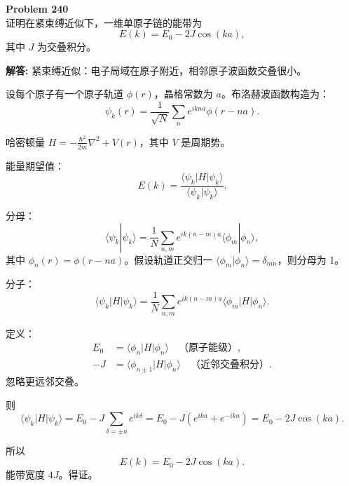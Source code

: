 \documentclass[12pt, a4paper, oneside]{ctexart}
\newenvironment{solution}{\par\noindent\textbf{解答:}\quad}{\par}
\begin{document}
\begin{mdframed}[backgroundcolor=gray!10, linewidth=0pt]
    \textbf{Problem 240} \\
    证明在紧束缚近似下，一维单原子链的能带为
    \[
    E(k) = E_0 - 2J \cos(k a),
    \]
    其中 $J$ 为交叠积分。
\end{mdframed}
\begin{solution}
    紧束缚近似：电子局域在原子附近，相邻原子波函数交叠很小。
    
    设每个原子有一个原子轨道 $\phi(r)$，晶格常数为 $a$。布洛赫波函数构造为：
    \[
    \psi_k(r) = \frac{1}{\sqrt{N}} \sum_n e^{i k n a} \phi(r - n a).
    \]
    
    哈密顿量 $H = -\frac{\hbar^2}{2m} \nabla^2 + V(r)$，其中 $V$ 是周期势。
    
    能量期望值：
    \[
    E(k) = \frac{\langle \psi_k | H | \psi_k \rangle}{\langle \psi_k | \psi_k \rangle}.
    \]
    
    分母：
    \[
    \langle \psi_k | \psi_k \rangle = \frac{1}{N} \sum_{n,m} e^{i k (n-m) a} \langle \phi_m | \phi_n \rangle,
    \]
    其中 $\phi_n(r) = \phi(r - n a)$。假设轨道正交归一 $\langle \phi_m | \phi_n \rangle = \delta_{mn}$，则分母为 1。
    
    分子：
    \[
    \langle \psi_k | H | \psi_k \rangle = \frac{1}{N} \sum_{n,m} e^{i k (n-m) a} \langle \phi_m | H | \phi_n \rangle.
    \]
    
    定义：
    \begin{align*}
        E_0 &= \langle \phi_n | H | \phi_n \rangle \quad \text{（原子能级）}, \\
        -J &= \langle \phi_{n\pm1} | H | \phi_n \rangle \quad \text{（近邻交叠积分）}.
    \end{align*}
    忽略更远邻交叠。
    
    则
    \[
    \langle \psi_k | H | \psi_k \rangle = E_0 - J \sum_{\delta=\pm a} e^{i k \delta} = E_0 - J (e^{i k a} + e^{-i k a}) = E_0 - 2J \cos(k a).
    \]
    
    所以
    \[
    E(k) = E_0 - 2J \cos(k a).
    \]
    能带宽度 $4J$。得证。
\end{solution}
\end{document}
